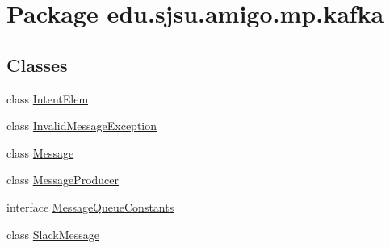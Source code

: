 \hypertarget{namespaceedu_1_1sjsu_1_1amigo_1_1mp_1_1kafka}{}\section{Package edu.\+sjsu.\+amigo.\+mp.\+kafka}
\label{namespaceedu_1_1sjsu_1_1amigo_1_1mp_1_1kafka}
\subsection*{Classes}
\begin{DoxyCompactItemize}
\item 
class \hyperlink{classedu_1_1sjsu_1_1amigo_1_1mp_1_1kafka_1_1_intent_elem}{Intent\+Elem}
\item 
class \hyperlink{classedu_1_1sjsu_1_1amigo_1_1mp_1_1kafka_1_1_invalid_message_exception}{Invalid\+Message\+Exception}
\item 
class \hyperlink{classedu_1_1sjsu_1_1amigo_1_1mp_1_1kafka_1_1_message}{Message}
\item 
class \hyperlink{classedu_1_1sjsu_1_1amigo_1_1mp_1_1kafka_1_1_message_producer}{Message\+Producer}
\item 
interface \hyperlink{interfaceedu_1_1sjsu_1_1amigo_1_1mp_1_1kafka_1_1_message_queue_constants}{Message\+Queue\+Constants}
\item 
class \hyperlink{classedu_1_1sjsu_1_1amigo_1_1mp_1_1kafka_1_1_slack_message}{Slack\+Message}
\end{DoxyCompactItemize}
